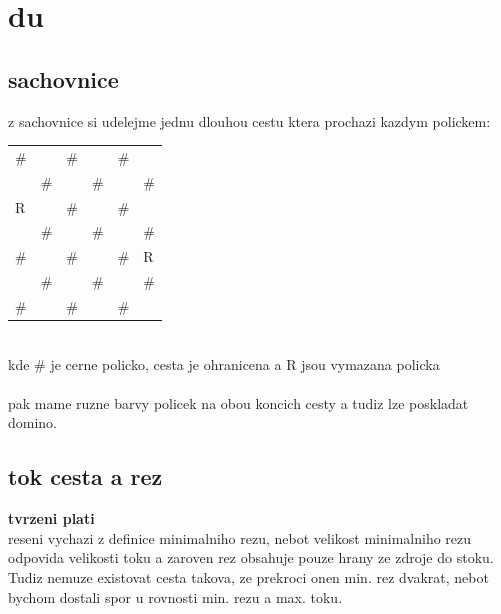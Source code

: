 \documentclass[a4paper]{article}
\begin{document}
\pagestyle{fancy}

\setcounter{section}{2}
\section{du}
\subsection{sachovnice}
z sachovnice si udelejme jednu dlouhou cestu ktera prochazi kazdym polickem:\\
\begin{tabular}{|l|l|l|l|l|l|} 
\hline
\multicolumn{1}{|l}{\#} & \multicolumn{1}{l}{}   & \multicolumn{1}{l}{\#} & \multicolumn{1}{l}{}   & \multicolumn{1}{l}{\#} &     \\ 
\cline{2-5}
                        & \multicolumn{1}{l}{\#} &                        & \multicolumn{1}{l}{\#} &                        & \#  \\
R                       &                        & \#                     &                        & \#                     &     \\
                        & \#                     &                        & \#                     &                        & \#  \\
\#                      &                        & \#                     &                        & \#                     & R   \\
                        & \#                     &                        & \#                     &                        & \#  \\
\multicolumn{1}{|l}{\#} &                        & \multicolumn{1}{l}{\#} &                        & \multicolumn{1}{l}{\#} &     \\
\hline
\end{tabular}\\
kde \# je cerne policko, cesta je ohranicena a R jsou vymazana policka\\
\\
pak mame ruzne barvy policek na obou koncich cesty a tudiz lze poskladat domino.

\subsection{tok cesta a rez}
\textbf{tvrzeni plati}\\
reseni vychazi z definice minimalniho rezu, nebot velikost minimalniho rezu odpovida velikosti toku a zaroven rez obsahuje pouze hrany ze zdroje do stoku.
Tudiz nemuze existovat cesta takova, ze prekroci onen min. rez dvakrat, nebot bychom dostali spor u rovnosti min. rezu a max. toku.
\end{document}
